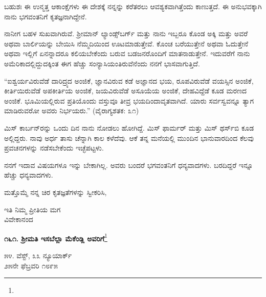 \vspace{0.15cm}

ಬಹುಶಃ ಈ ಉನ್ಮತ್ತ ಆಕಾಂಕ್ಷೆಗಳು ಈ ದೇಶಕ್ಕೆ ನನ್ನನ್ನು ಕರೆತರಲು ಆವಶ್ಯಕವಾಗಿತ್ತೆಂದು ಕಾಣುತ್ತದೆ. ಈ ಅನುಭವಕ್ಕಾಗಿ ನಾನು ಭಗವಂತನಿಗೆ ಕೃತಜ್ಞನಾಗಿದ್ದೇನೆ.

\vspace{0.15cm}

ನಾನೀಗ ಬಹಳ ಸುಖವಾಗಿರುವೆ. ಶ‍್ರೀಮಾನ್ ಲ್ಯಾಂಡ್ಸ್‌ಬರ್ಗ್ ಮತ್ತು ನಾನು ಇಬ್ಬರೂ ಕೊಂಡ ಅಕ್ಕಿ ಮತ್ತು ಅವರೆ ಅಥವಾ ಬಾರ್ಲಿಯನ್ನು ಬೇಯಿಸಿ ನೆಮ್ಮದಿಯಿಂದ ಊಟಮಾಡುತ್ತೇವೆ. ಕೊಂಚ ಬರೆಯುತ್ತೇನೆ ಅಥವಾ ಓದುತ್ತೇನೆ ಅಥವಾ ಇಲ್ಲಿಗೆ ಏನನ್ನಾದರೂ ಕಲಿಯಬೇಕೆಂದು ಬರುವ ಬಡಜನರೊಂದಿಗೆ ಮಾತನಾಡುತ್ತೇನೆ. ಇದುವರೆಗೆ ನಾನು ಅಮೆರಿಕಾದಲ್ಲಿದ್ದುದಕ್ಕಿಂತ ಈಗ ಹೆಚ್ಚು ಸಂನ್ಯಾಸಿಯಂತಿರುವೆನೆಂದು ನನಗೆ ಭಾಸವಾಗುತ್ತಿದೆ.

\vspace{0.15cm}

“ಐಶ್ವರ್ಯವಿರುವೆಡೆ ದಾರಿದ್ರ್ಯದ ಅಂಜಿಕೆ, ಜ್ಞಾನವಿರುವ ಕಡೆ ಅಜ್ಞಾನದ ಭಯ, ರೂಪವಿರುವೆಡೆ ವಯಸ್ಸಿನ ಅಂಜಿಕೆ, ಕೀರ್ತಿಯಿರುವೆಡೆ ಅಪಕೀರ್ತಿಯ ಅಂಜಿಕೆ, ಜಯವಿರುವೆಡೆ ಅಸೂಯೆಯ ಅಂಜಿಕೆ, ದೇಹವಿದ್ದೆಡೆ ಕೂಡ ಮರಣದ ಅಂಜಿಕೆ. ಭೂಮಿಯಲ್ಲಿರುವ ಪ್ರತಿಯೊಂದು ವಸ್ತುವೂ ತೀವ್ರ ಭಯದಿಂದಾವೃತವಾಗಿದೆ. ಯಾರು ಸರ್ವಸ್ವವನ್ನೂ ತ್ಯಾಗ ಮಾಡಿರುವರೋ ಅವರು ನಿರ್ಭಯರು.” (ವೈರಾಗ್ಯಶತಕ: ೩೧)

\vspace{0.15cm}

ಮಿಸ್ ಕಾರ್ಬನ್‌ರನ್ನು ಒಂದು ದಿನ ನಾನು ನೋಡಲು ಹೋಗಿದ್ದೆ. ಮಿಸ್ ಫಾರ್ಮರ್‌ ಮತ್ತು ಮಿಸ್ ಥರ್ಸ್‌ಬಿ ಕೂಡ ಅಲ್ಲಿದ್ದರು. ನಾವು ಅರ್ಧ ತಾಸು ಚೆನ್ನಾಗಿ ಕಾಲ ಕಳೆದೆವು. ಆಕೆ ತನ್ನ ಮನೆಯಲ್ಲಿ ಮುಂದಿನ ಭಾನುವಾರದಿಂದ ಕೆಲವು ಪ್ರವಚನಗಳನ್ನು ನಡೆಸಬೇಕೆಂದು ಇಚ್ಛೆಪಟ್ಟಳು.

\vspace{0.15cm}
ನನಗೆ ಇದಾವ ವಿಷಯಗಳೂ ಇನ್ನು ಬೇಕಾಗಿಲ್ಲ. ಅವರು ಬಂದರೆ ಭಗವಂತನಿಗೆ ಧನ್ಯವಾದಗಳು. ಬರದಿದ್ದರೆ ಇನ್ನೂ ಹೆಚ್ಚು ಧನ್ಯವಾದಗಳು.

\vspace{0.15cm}

ಮತ್ತೊಮ್ಮೆ ನನ್ನ ಚಿರ ಕೃತಜ್ಞತೆಗಳನ್ನು ಸ್ವೀಕರಿಸಿ,

{\flushright
ಇತಿ ನಿಮ್ಮ ಪ್ರೀತಿಯ ಮಗ\\ವಿವೇಕಾನಂದ\par}

\newpage

\begin{center}
\textbf{೧೬೧. ಶ‍್ರೀಮತಿ ಇಸಬೆಲ್ಲಾ ಮೆಕೆಂಡ್ಲಿ ಅವರಿಗೆ}\footnote{}
\end{center}

\begin{flushright}
೫೪. ವೆಸ್ಟ್, ೩೩ ನ್ಯೂಯಾರ್ಕ್\\೨೫ನೇ ಫೆಬ್ರವರಿ ೧೮೯೫
\end{flushright}

